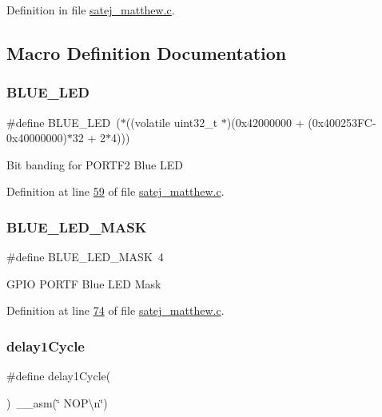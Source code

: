 Definition in file \mbox{\hyperlink{satej__matthew_8c_source}{satej\+\_\+matthew.\+c}}.



\subsection{Macro Definition Documentation}
\mbox{\label{satej__matthew_8c_a41c7fcbe209a1c236fd1b8e35bd8b55a}} 
\subsubsection{\texorpdfstring{BLUE\_LED}{BLUE\_LED}}
{\footnotesize\ttfamily \#define B\+L\+U\+E\+\_\+\+L\+ED~($\ast$((volatile uint32\+\_\+t $\ast$)(0x42000000 + (0x400253\+F\+C-\/0x40000000)$\ast$32 + 2$\ast$4)))}

Bit banding for P\+O\+R\+T\+F2 Blue L\+ED 

Definition at line \mbox{\hyperlink{satej__matthew_8c_source_l00059}{59}} of file \mbox{\hyperlink{satej__matthew_8c_source}{satej\+\_\+matthew.\+c}}.

\mbox{\label{satej__matthew_8c_a6f2788e548d65bbb864b965c72a7bf56}} 
\subsubsection{\texorpdfstring{BLUE\_LED\_MASK}{BLUE\_LED\_MASK}}
{\footnotesize\ttfamily \#define B\+L\+U\+E\+\_\+\+L\+E\+D\+\_\+\+M\+A\+SK~4}

G\+P\+IO P\+O\+R\+TF Blue L\+ED Mask 

Definition at line \mbox{\hyperlink{satej__matthew_8c_source_l00074}{74}} of file \mbox{\hyperlink{satej__matthew_8c_source}{satej\+\_\+matthew.\+c}}.

\mbox{\label{satej__matthew_8c_a056fe4f6b582ad913e07654bb2bf1980}} 
\subsubsection{\texorpdfstring{delay1Cycle}{delay1Cycle}}
{\footnotesize\ttfamily \#define delay1\+Cycle(\begin{DoxyParamCaption}{ }\end{DoxyParamCaption})~\+\_\+\+\_\+asm(\char`\"{} N\+O\+P\textbackslash{}n\char`\"{})}

